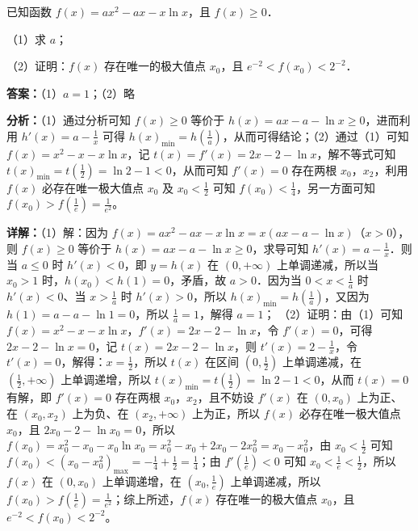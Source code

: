 \begin{question}[points=12]
已知函数 $f(x)=ax^2-ax-x\ln x$，且 $f(x)\ge0$．

（1）求 $a$；

（2）证明：$f(x)$ 存在唯一的极大值点 $x_0$，且 $e^{-2}<f(x_0)<2^{-2}$．
\begin{solution}
\textbf{答案：}（1）$a=1$；（2）略

\textbf{分析：}（1）通过分析可知 $f(x)\ge0$ 等价于 $h(x)=ax-a-\ln x\ge0$，进而利用 $h'(x)=a-\frac{1}{x}$ 可得 $h(x)_{\min}=h(\frac{1}{a})$，从而可得结论；（2）通过（1）可知 $f(x)=x^2-x-x\ln x$，记 $t(x)=f'(x)=2x-2-\ln x$，解不等式可知 $t(x)_{\min}=t(\frac{1}{2})=\ln2-1<0$，从而可知 $f'(x)=0$ 存在两根 $x_0$，$x_2$，利用 $f(x)$ 必存在唯一极大值点 $x_0$ 及 $x_0<\frac{1}{2}$ 可知 $f(x_0)<\frac{1}{4}$，另一方面可知 $f(x_0)>f(\frac{1}{e})=\frac{1}{e^2}$。

\textbf{详解：}（1）解：因为 $f(x)=ax^2-ax-x\ln x=x(ax-a-\ln x)$（$x>0$），则 $f(x)\ge0$ 等价于 $h(x)=ax-a-\ln x\ge0$，求导可知 $h'(x)=a-\frac{1}{x}$．则当 $a\le0$ 时 $h'(x)<0$，即 $y=h(x)$ 在 $(0,+\infty)$ 上单调递减，所以当 $x_0>1$ 时，$h(x_0)<h(1)=0$，矛盾，故 $a>0$．因为当 $0<x<\frac{1}{a}$ 时 $h'(x)<0$、当 $x>\frac{1}{a}$ 时 $h'(x)>0$，所以 $h(x)_{\min}=h(\frac{1}{a})$，又因为 $h(1)=a-a-\ln1=0$，所以 $\frac{1}{a}=1$，解得 $a=1$；
（2）证明：由（1）可知 $f(x)=x^2-x-x\ln x$，$f'(x)=2x-2-\ln x$，令 $f'(x)=0$，可得 $2x-2-\ln x=0$，记 $t(x)=2x-2-\ln x$，则 $t'(x)=2-\frac{1}{x}$，令 $t'(x)=0$，解得：$x=\frac{1}{2}$，所以 $t(x)$ 在区间 $(0,\frac{1}{2})$ 上单调递减，在 $(\frac{1}{2},+\infty)$ 上单调递增，所以 $t(x)_{\min}=t(\frac{1}{2})=\ln2-1<0$，从而 $t(x)=0$ 有解，即 $f'(x)=0$ 存在两根 $x_0$，$x_2$，且不妨设 $f'(x)$ 在 $(0,x_0)$ 上为正、在 $(x_0,x_2)$ 上为负、在 $(x_2,+\infty)$ 上为正，所以 $f(x)$ 必存在唯一极大值点 $x_0$，且 $2x_0-2-\ln x_0=0$，所以 $f(x_0)=x_0^2-x_0-x_0\ln x_0=x_0^2-x_0+2x_0-2x_0^2=x_0-x_0^2$，由 $x_0<\frac{1}{2}$ 可知 $f(x_0)<(x_0-x_0^2)_{\max}=-\frac{1}{4}+\frac{1}{2}=\frac{1}{4}$；由 $f'(\frac{1}{e})<0$ 可知 $x_0<\frac{1}{e}<\frac{1}{2}$，所以 $f(x)$ 在 $(0,x_0)$ 上单调递增，在 $(x_0,\frac{1}{e})$ 上单调递减，所以 $f(x_0)>f(\frac{1}{e})=\frac{1}{e^2}$；综上所述，$f(x)$ 存在唯一的极大值点 $x_0$，且 $e^{-2}<f(x_0)<2^{-2}$。
\end{solution}
\end{question}

